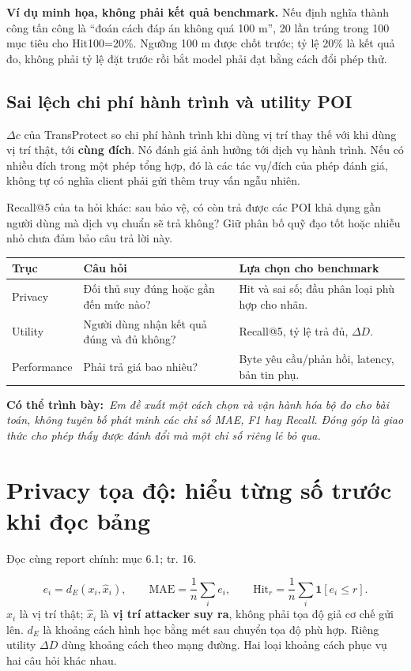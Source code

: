 \documentclass[10pt,a4paper]{article}
\newcommand{\say}[1]{\par\textbf{Có thể trình bày:}\ \textit{#1}\par}
\newcommand{\where}[1]{\par{\small\color{gray}Đọc cùng report chính: #1.}\par}
\newcommand{\example}{\textbf{Ví dụ minh họa, không phải kết quả benchmark.} }
\newcommand{\guidepage}[1]{\clearpage\section{#1}}
\begin{document}
\example Nếu định nghĩa thành công tấn công là ``đoán cách đáp án không quá 100 m'', 20 lần trúng trong 100 mục tiêu cho Hit100=20\%. Ngưỡng 100 m được chốt trước; tỷ lệ 20\% là kết quả đo, không phải tỷ lệ đặt trước rồi bắt model phải đạt bằng cách đổi phép thử.

\subsection*{Sai lệch chi phí hành trình và utility POI}
$\Delta c$ của TransProtect so chi phí hành trình khi dùng vị trí thay thế với khi dùng vị trí thật, tới \textbf{cùng đích}. Nó đánh giá ảnh hưởng tới dịch vụ hành trình. Nếu có nhiều đích trong một phép tổng hợp, đó là các tác vụ/đích của phép đánh giá, không tự có nghĩa client phải gửi thêm truy vấn ngẫu nhiên.

Recall@5 của ta hỏi khác: sau bảo vệ, có còn trả được các POI khả dụng gần người dùng mà dịch vụ chuẩn sẽ trả không? Giữ phân bố quỹ đạo tốt hoặc nhiễu nhỏ chưa đảm bảo câu trả lời này.

\begin{longtable}{@{}P{4.0cm}P{6.1cm}P{6.1cm}@{}}
\toprule Trục & Câu hỏi & Lựa chọn cho benchmark\\\midrule
Privacy & Đối thủ suy đúng hoặc gần đến mức nào? & Hit và sai số; đầu phân loại phù hợp cho nhãn.\\[3pt]
Utility & Người dùng nhận kết quả đúng và đủ không? & Recall@5, tỷ lệ trả đủ, $\Delta D$.\\[3pt]
Performance & Phải trả giá bao nhiêu? & Byte yêu cầu/phản hồi, latency, bản tin phụ.\\
\bottomrule
\end{longtable}
\say{Em đề xuất một cách chọn và vận hành hóa bộ đo cho bài toán, không tuyên bố phát minh các chỉ số MAE, F1 hay Recall. Đóng góp là giao thức cho phép thấy được đánh đổi mà một chỉ số riêng lẻ bỏ qua.}

\guidepage{Privacy tọa độ: hiểu từng số trước khi đọc bảng}
\where{mục 6.1; tr. 16}
\[
e_i=d_E(x_i,\widehat x_i),\qquad
\mathrm{MAE}=\frac1n\sum_i e_i,\qquad
\mathrm{Hit}_r=\frac1n\sum_i\mathbf 1[e_i\le r].
\]
$x_i$ là vị trí thật; $\widehat x_i$ là \textbf{vị trí attacker suy ra}, không phải tọa độ giả cơ chế gửi lên. $d_E$ là khoảng cách hình học bằng mét sau chuyển tọa độ phù hợp. Riêng utility $\Delta D$ dùng khoảng cách theo mạng đường. Hai loại khoảng cách phục vụ hai câu hỏi khác nhau.
\end{document}
